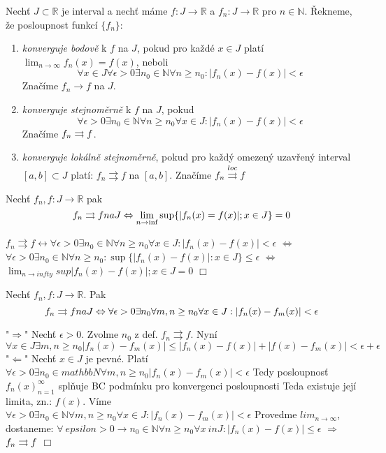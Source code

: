 \begin{definice}
Nechť $J \subset \mathbb{R}$ je interval a nechť máme $f : J \rightarrow \mathbb{R}$ a $f_n : J \rightarrow \mathbb{R}$ pro $n \in \mathbb{N}$. Řekneme, že posloupnost funkcí $\{f_n\}$:

\begin{enumerate}
\item \emph{konverguje bodově} k $f$ na $J$, pokud pro každé $x \in J$ platí $\lim_{n \rightarrow \infty} f_n(x) = f(x)$, neboli
$$\forall x \in J \forall \epsilon > 0 \exists n_0 \in \mathbb{N} \forall n \geq n_0 : |f_n(x) - f(x)| < \epsilon$$
Značíme $f_n \rightarrow f$ na $J$.
\item \emph{konverguje stejnoměrně} k $f$ na $J$, pokud
$$\forall \epsilon > 0 \exists n_0 \in \mathbb{N} \forall n \geq n_0 \forall x \in J : | f_n(x) - f(x) | < \epsilon$$
Značíme $f_n \rightrightarrows f$.
\item \emph{konverguje lokálně stejnoměrně}, pokud pro každý omezený uzavřený interval $[a, b] \subset J$ platí: $f_n \rightrightarrows f$ na $[a, b]$. Značíme $f_n \overset{loc}{\rightrightarrows} f$
\end{enumerate}
\end{definice}

\begin{vetal}
Nechť $f_n, f:J \rightarrow \mathbb{R}$ pak
$$f_n \rightrightarrows f na J \Leftrightarrow \lim_{n \rightarrow \inf} \sup \{ |f_n(x) = f(x)|; x \in J \} = 0$$
\begin{dukaz}
$f_n \rightrightarrows f \leftrightarrow \forall \epsilon > 0 \exists n_0 \in \mathbb{N} \forall n \geq n_0 \forall x \in J: |f_n(x) - f(x)| < \epsilon$
$\Leftrightarrow$
$\forall \epsilon > 0 \exists n_0 \in \mathbb{N} \forall n \geq n_0 : \sup \{ |f_n(x) - f(x) | : x \in J \} \leq \epsilon$
$\Leftrightarrow$
$\lim_{n \to infty} sup{|f_n(x)-f(x)|;x \in J} = 0$
$\Box$
\end{dukaz}
\end{vetal}

\begin{vetat}
Nechť $f_n,f : J \rightarrow \mathbb{R}$. Pak
$$f_n \rightrightarrows f na J \Leftrightarrow \forall \epsilon > 0 \exists n_0 \forall m,n \geq n_0 \forall x \in J : | f_n(x) - f_m(x)| < \epsilon$$
\begin{dukaz}
"$\Rightarrow$" 
Nechť $\epsilon > 0.$ Zvolme $n_0$ z def. $f_n \rightrightarrows f.$ 
Nyní $\forall x \in J \exists m,n \geq n_0 |f_n(x) - f_m(x) | \leq |f_n(x) - f(x)| + |f(x) - f_m(x)| < \epsilon + \epsilon $
"$\Leftarrow$"
Nechť $x \in J$ je pevné. Platí $\forall \epsilon > 0 \exists n_0 \in mathbb{N} \forall m,n \geq n_0|f_n(x) - f_m(x)| < \epsilon$
Tedy posloupnosť ${f_n(x)}_{n=1}^\infty$ splňuje BC podmínku pro konvergenci posloupnosti Teda existuje její limita, zn.: $f(x)$.
Víme $\forall \epsilon > 0 \exists n_0 \in \mathbb{N} \forall m,n \geq n_0 \forall x \in J: |f_n(x)-f_m(x)|<\epsilon$
Provedme $lim_{n \to \infty}$, dostaneme:
$\forall \ epsilon > 0 \rightarrow n_0 \in \mathbb{N} \forall n \geq n_0 \forall x\ in J: |f_n(x) - f(x)| \leq \epsilon$
$\Rightarrow$
$f_n \rightrightarrows f$
$\Box$
\end{dukaz}
\end{vetat}


